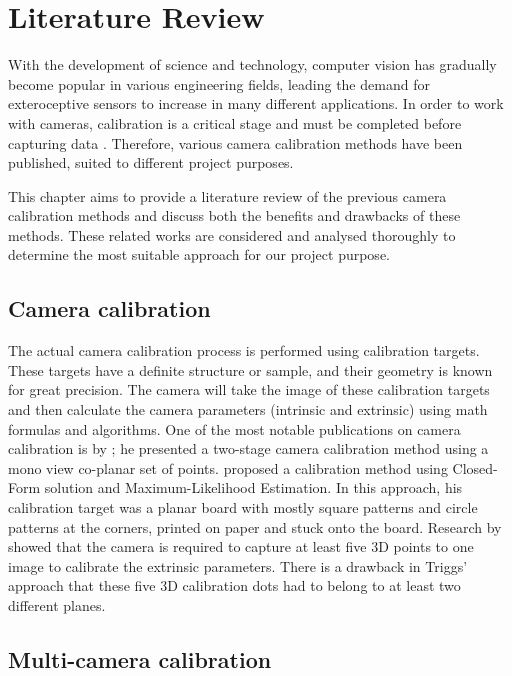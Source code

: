 \chapter{Literature Review}
With the development of science and technology, computer vision has gradually become popular in various engineering fields, leading the demand for exteroceptive sensors to increase in many different applications. In order to work with cameras, calibration is a critical stage and must be completed before capturing data \citep{Baker2003}. Therefore, various camera calibration methods have been published, suited to different project purposes. 

This chapter aims to provide a literature review of the previous camera calibration methods and discuss both the benefits and drawbacks of these methods. These related works are considered and analysed thoroughly to determine the most suitable approach for our project purpose.


\section{Camera calibration}
The actual camera calibration process is performed using calibration targets. These targets have a definite structure or sample, and their geometry is known for great precision. The camera will take the image of these calibration targets and then calculate the camera parameters (intrinsic and extrinsic) using math formulas and algorithms. One of the most notable publications on camera calibration is by \cite{Tsai1987}; he presented a two-stage camera calibration method using a mono view co-planar set of points. \cite{Zhang2000} proposed a calibration method using Closed-Form solution and Maximum-Likelihood Estimation. In this approach, his calibration target was a planar board with mostly square patterns and circle patterns at the corners, printed on paper and stuck onto the board. Research by \cite{Triggs1999} showed that the camera is required to capture at least five 3D points to one image to calibrate the extrinsic parameters. There is a drawback in Triggs' approach that these five 3D calibration dots had to belong to at least two different planes. 

\section{Multi-camera calibration}

